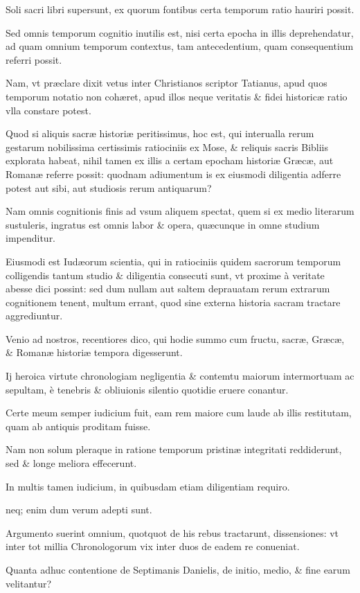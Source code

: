 \begin{parnumbers}
Soli sacri libri supersunt, ex quorum fontibus
certa temporum ratio hauriri possit.

Sed omnis temporum cognitio
inutilis est, nisi certa epocha in illis deprehendatur, ad quam omnium
temporum contextus, tam antecedentium, quam consequentium referri
possit.

Nam, vt præclare dixit vetus inter Christianos scriptor
Tatianus, apud quos temporum notatio non cohæret, apud illos neque
veritatis \& fidei historicæ ratio vlla constare potest.

Quod si aliquis
sacræ historiæ peritissimus, hoc est, qui interualla rerum gestarum
nobilissima certissimis ratiociniis ex Mose, \&
 reliquis sacris Bibliis explorata
habeat, nihil tamen ex illis a certam epocham historiæ Græcæ,
aut Romanæ referre possit: quodnam adiumentum is ex eiusmodi
diligentia adferre potest aut sibi, aut studiosis rerum antiquarum?

Nam omnis cognitionis finis ad vsum aliquem spectat, quem si ex medio
literarum sustuleris, ingratus est omnis labor \& opera, quæcunque
in omne studium impenditur.

Eiusmodi est Iudæorum scientia, qui
in ratiociniis quidem sacrorum temporum colligendis tantum studio
\& diligentia consecuti sunt, vt proxime à veritate abesse dici possint: sed
dum nullam aut saltem deprauatam rerum extrarum cognitionem
tenent, multum errant, quod sine externa historia sacram tractare
aggrediuntur.

Venio ad nostros, recentiores dico, qui hodie summo
cum fructu, sacræ, Græcæ, \& Romanæ historiæ tempora digesserunt.

Ij heroica virtute chronologiam negligentia \& contemtu maiorum
intermortuam ac sepultam, è tenebris \& obliuionis silentio quotidie
eruere conantur.

Certe meum semper iudicium fuit, eam rem maiore
cum laude ab illis restitutam, quam ab antiquis proditam fuisse.

Nam
non solum pleraque in ratione temporum pristinæ integritati reddiderunt,
sed \& longe meliora effecerunt.

In multis tamen iudicium, in quibusdam
etiam diligentiam requiro.

neq; enim dum verum adepti sunt.

Argumento suerint omnium, quotquot de his rebus tractarunt, dissensiones:
vt inter tot millia Chronologorum vix inter duos de eadem re
conueniat.

Quanta adhuc contentione de Septimanis Danielis, de initio,
medio, \& fine earum velitantur?


\end{parnumbers}
